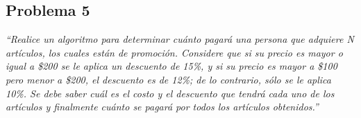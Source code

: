 \subsection{Problema 5}

\textit {“Realice un algoritmo para determinar cuánto pagará una persona que adquiere N artículos, los cuales están de promoción. Considere que si su precio es mayor o igual a \$200 se le aplica un descuento de 15\%, y si su precio es mayor a \$100 pero menor a \$200, el descuento es de 12\%; de lo contrario, sólo se le aplica 10\%. Se debe saber cuál es el costo y el descuento que tendrá cada uno de los artículos y finalmente cuánto se pagará por todos los artículos obtenidos.”}

